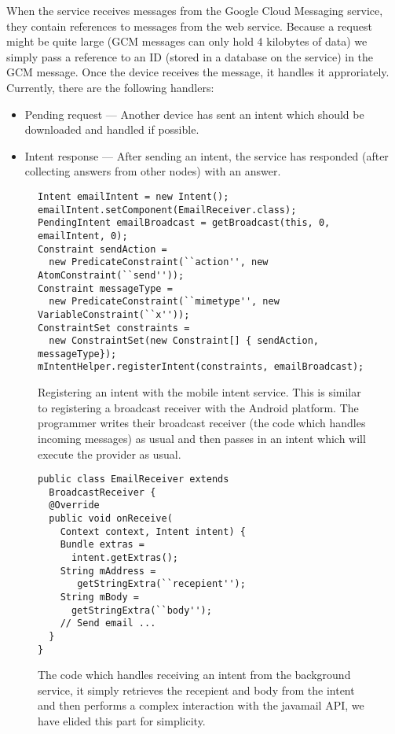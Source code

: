 \documentclass{acm_proc_article-sp}
\begin{document}
When the service receives messages from the Google Cloud Messaging
service, they contain references to messages from the web service.
Because a request might be quite large (GCM messages can only hold 4
kilobytes of data) we simply pass a reference to an ID (stored in a
database on the service) in the GCM message.  Once the device receives
the message, it handles it approriately.  Currently, there are the
following handlers:

\begin{itemize}
\item Pending request --- Another device has sent an intent which
  should be downloaded and handled if possible.
\item Intent response --- After sending an intent, the service has
  responded (after collecting answers from other nodes) with an
  answer.
\end{itemize}

\begin{figure*}
\begin{lstlisting}
Intent emailIntent = new Intent();
emailIntent.setComponent(EmailReceiver.class);
PendingIntent emailBroadcast = getBroadcast(this, 0, emailIntent, 0);
Constraint sendAction = 
  new PredicateConstraint(``action'', new AtomConstraint(``send''));
Constraint messageType = 
  new PredicateConstraint(``mimetype'', new VariableConstraint(``x''));
ConstraintSet constraints = 
  new ConstraintSet(new Constraint[] { sendAction, messageType});
mIntentHelper.registerIntent(constraints, emailBroadcast);
\end{lstlisting}
\caption{Registering an intent with the mobile intent service.  This
  is similar to registering a broadcast receiver with the Android
  platform.  The programmer writes their broadcast receiver (the code
  which handles incoming messages) as usual and then passes in an
  intent which will execute the provider as usual.}
\end{figure*}

\begin{figure}
  \label{fig:email-receiver}
  \begin{lstlisting}
public class EmailReceiver extends
  BroadcastReceiver {
  @Override
  public void onReceive(
    Context context, Intent intent) {
    Bundle extras = 
      intent.getExtras();
    String mAddress =
       getStringExtra(``recepient'');
    String mBody = 
      getStringExtra(``body'');
    // Send email ...
  }
} 
\end{lstlisting}
\caption{The code which handles receiving an intent from the
  background service, it simply retrieves the recepient and body from
  the intent and then performs a complex interaction with the javamail
  API, we have elided this part for simplicity.}
\end{figure}
\end{document}
